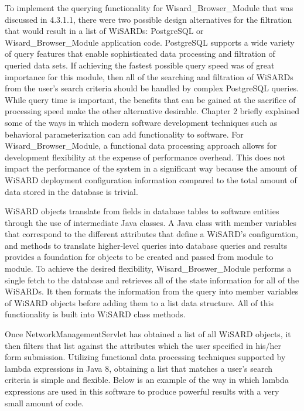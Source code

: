 To implement the querying functionality for Wisard\_Browser\_Module that was discussed in 4.3.1.1, there were two possible design alternatives for the filtration that would result in a list of WiSARDs: PostgreSQL or Wisard\_Browser\_Module application code. PostgreSQL supports a wide variety of query features that enable sophisticated data processing and filtration of queried data sets. If achieving the fastest possible query speed was of great importance for this module, then all of the searching and filtration of WiSARDs from the user's search criteria should be handled by complex PostgreSQL queries. While query time is important, the benefits that can be gained at the sacrifice of processing speed make the other alternative desirable. Chapter 2 briefly explained some of the ways in which modern software development techniques such as behavioral parameterization can add functionality to software. For Wisard\_Browser\_Module, a functional data processing approach allows for development flexibility at the expense of performance overhead. This does not impact the performance of the system in a significant way because the amount of WiSARD deployment configuration information compared to the total amount of data stored in the database is trivial.

WiSARD objects translate from fields in database tables to software entities through the use of intermediate Java classes. A Java class with member variables that correspond to the different attributes that define a WiSARD's configuration, and methods to translate higher-level queries into database queries and results provides a foundation for objects to be created and passed from module to module. To achieve the desired flexibility, Wisard\_Broswer\_Module performs a single fetch to the database and retrieves all of the state information for all of the WiSARDs. It then formats the information from the query into member variables of WiSARD objects before adding them to a list data structure. All of this functionality is built into WiSARD class methods.

Once NetworkManagementServlet has obtained a list of all WiSARD objects, it then filters that list against the attributes which the user specified in his/her form submission. Utilizing functional data processing techniques supported by lambda expressions in Java 8, obtaining a list that matches a user's search criteria is simple and flexible. Below is an example of the way in which lambda expressions are used in this software to produce powerful results with a very small amount of code.

